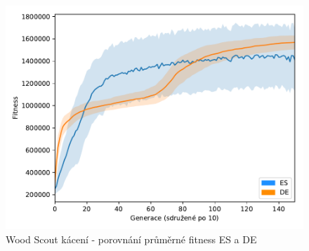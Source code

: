 	\newpage
	\begin{figure}[h]\centering
		\includegraphics[width=\columnwidth]{../img/WoodMap/DEvsES/WCuttorCutMem}
		\caption{Wood Scout kácení - porovnání průměrné fitness ES a DE}
		\label{obr04:CutESvsDE}
	\end{figure}	
